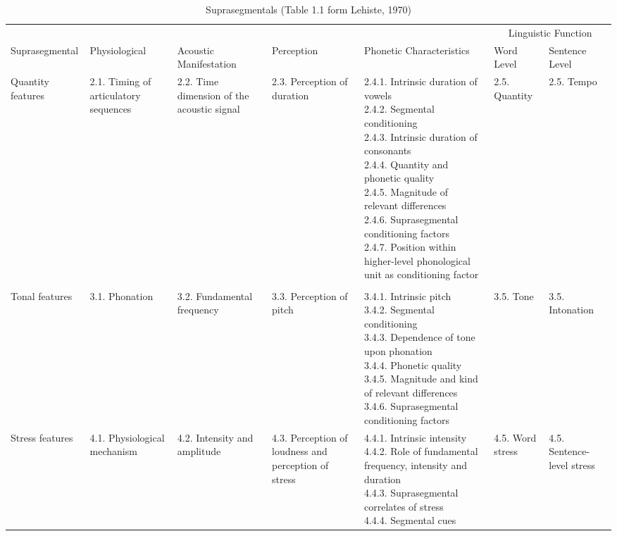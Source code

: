 \begin{landscape}
\begin{table}[p]
\centering
\scriptsize
\sloppy
\begin{tabular}{lp{1.8cm}p{3cm}p{1.7cm}llp{2cm}}
\mytoprule
& & & & & \multicolumn{2}{c}{Linguistic Function}\\
Suprasegmental & Physiological & Acoustic \mbox{Manifestation} & Perception & Phonetic Characteristics & Word Level & Sentence Level \\
\midrule
{Quantity features} & {2.1. Timing of articulatory sequences} & {2.2. Time dimension of the acoustic signal} & {2.3. Perception of duration} & \parbox[t]{3cm}{2.4.1. Intrinsic duration of vowels\\
2.4.2. Segmental conditioning \\
2.4.3. Intrinsic duration of consonants \\
2.4.4. Quantity and phonetic quality \\
2.4.5. Magnitude of relevant differences\\
2.4.6. Suprasegmental conditioning factors\\
2.4.7. Position within higher-level phonological unit as conditioning factor
}& {2.5. Quantity} & {2.5. Tempo} \\
& & \\
{Tonal features} & {3.1. Phonation} & {3.2. Fundamental frequency} & {3.3. Perception of pitch} & \parbox[t]{3cm}{3.4.1. Intrinsic pitch \\
3.4.2. Segmental conditioning \\
3.4.3. Dependence of tone upon phonation \\
3.4.4. Phonetic quality \\
3.4.5. Magnitude and kind of relevant differences\\
3.4.6. Suprasegmental conditioning factors \\
}
& {3.5. Tone} & {3.5. Intonation} \\
{Stress features} & {4.1. Physiological mechanism} & {4.2. Intensity and amplitude} & {4.3. Perception of loudness and perception of stress} & \parbox[t]{3cm}{4.4.1. Intrinsic intensity \\
4.4.2. Role of fundamental frequency, intensity and duration\\
4.4.3. Suprasegmental correlates of stress\\
4.4.4. Segmental cues\\
}
& {4.5. Word stress} & {4.5. Sentence-level stress} \\
\end{tabular}
\caption{Suprasegmentals (Table 1.1 form Lehiste, 1970)}
\label{tab51}\end{table}
\end{landscape}
